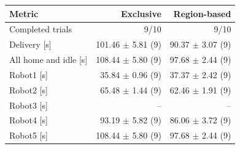 \begin{tabular}{@{}lrr@{}}
\toprule
Metric & Exclusive & Region-based \\
\midrule
Completed trials & 9/10 & 9/10 \\
\midrule
Delivery [s] & 101.46 $\pm$ 5.81 (9) & 90.37 $\pm$ 3.07 (9) \\
All home and idle [s] & 108.44 $\pm$ 5.80 (9) & 97.68 $\pm$ 2.44 (9) \\
Robot1 [s] & 35.84 $\pm$ 0.96 (9) & 37.37 $\pm$ 2.42 (9) \\
Robot2 [s] & 65.48 $\pm$ 1.44 (9) & 62.46 $\pm$ 1.91 (9) \\
Robot3 [s] & -- & -- \\
Robot4 [s] & 93.19 $\pm$ 5.82 (9) & 86.06 $\pm$ 3.72 (9) \\
Robot5 [s] & 108.44 $\pm$ 5.80 (9) & 97.68 $\pm$ 2.44 (9) \\
\bottomrule
\end{tabular}

